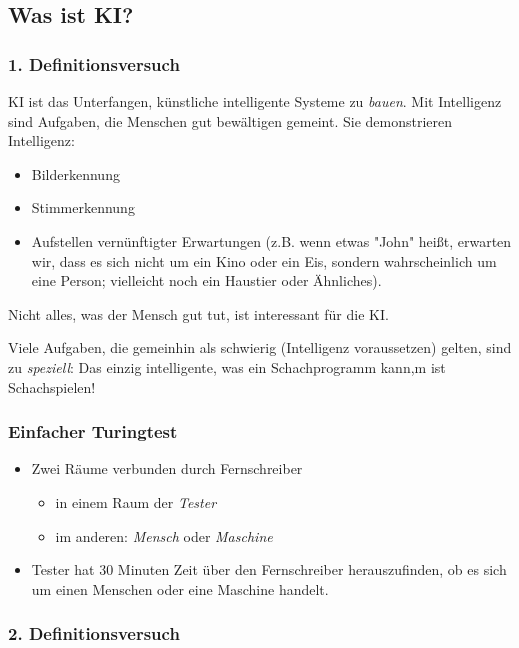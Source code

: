 \documentclass[runningheads]{llncs}
\begin{document}
\subsection{Was ist KI?}

\subsubsection{1. Definitionsversuch}

KI ist das Unterfangen, künstliche intelligente Systeme zu \textit{bauen}.
Mit Intelligenz sind Aufgaben, die Menschen gut bewältigen gemeint. Sie
demonstrieren Intelligenz:

\begin{itemize}
    \item Bilderkennung
    \item Stimmerkennung
    \item Aufstellen vernünftigter Erwartungen (z.B. wenn etwas "John" heißt, erwarten wir, dass es sich nicht um ein Kino oder ein Eis, sondern wahrscheinlich um eine Person; vielleicht noch ein Haustier oder Ähnliches). 
\end{itemize}

Nicht alles, was der Mensch gut tut, ist interessant für die KI. 

Viele Aufgaben, die gemeinhin als schwierig (Intelligenz voraussetzen) gelten, sind zu \textit{speziell}: Das einzig intelligente, was ein Schachprogramm kann,m ist Schachspielen!

\subsubsection{Einfacher Turingtest}
\begin{itemize}
    \item Zwei Räume verbunden durch Fernschreiber
    \begin{itemize}
        \item in einem Raum der \textit{Tester}
        \item im anderen: \textit{Mensch} oder \textit{Maschine}
    \end{itemize}
    \item Tester hat 30 Minuten Zeit über den Fernschreiber herauszufinden, ob es sich um einen Menschen oder eine Maschine handelt.
\end{itemize}

\subsubsection{2. Definitionsversuch}
\end{document}
